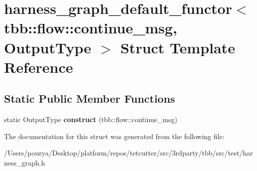 \hypertarget{structharness__graph__default__functor_3_01tbb_1_1flow_1_1continue__msg_00_01OutputType_01_4}{}\section{harness\+\_\+graph\+\_\+default\+\_\+functor$<$ tbb\+:\+:flow\+:\+:continue\+\_\+msg, Output\+Type $>$ Struct Template Reference}
\label{structharness__graph__default__functor_3_01tbb_1_1flow_1_1continue__msg_00_01OutputType_01_4}
\subsection*{Static Public Member Functions}
\begin{DoxyCompactItemize}
\item 
\hypertarget{structharness__graph__default__functor_3_01tbb_1_1flow_1_1continue__msg_00_01OutputType_01_4_ada00d9ee8c1e4f920dd293fa20756c2d}{}static Output\+Type {\bfseries construct} (tbb\+::flow\+::continue\+\_\+msg)\label{structharness__graph__default__functor_3_01tbb_1_1flow_1_1continue__msg_00_01OutputType_01_4_ada00d9ee8c1e4f920dd293fa20756c2d}

\end{DoxyCompactItemize}


The documentation for this struct was generated from the following file\+:\begin{DoxyCompactItemize}
\item 
/\+Users/pourya/\+Desktop/platform/repos/tetcutter/src/3rdparty/tbb/src/test/harness\+\_\+graph.\+h\end{DoxyCompactItemize}
